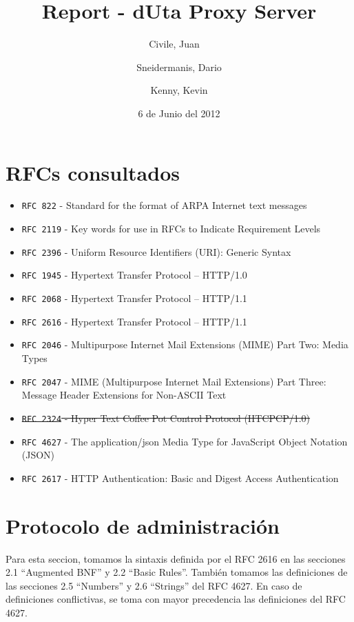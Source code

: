 \documentclass[11pt,a4paper,titlepage]{article}
\title{Report - dUta Proxy Server}
\author{Civile, Juan\ \  \and Sneidermanis, Dario \and Kenny, Kevin}
\date{6 de Junio del 2012}
\begin{document}
\newcommand{\awesome}[1]{\texttt{\large #1}}
\newcommand{\ua}{\textit{User Agent} }
\newcommand{\os}{\textit{Origin Server} }
\newcommand{\duta}{\awesome{dUta} }

\maketitle
\tableofcontents
\clearpage

\section{RFCs consultados}

\begin{itemize}

    \item \awesome{RFC 822}  - Standard for the format of ARPA Internet text messages
    \item \awesome{RFC 2119} - Key words for use in RFCs to Indicate Requirement Levels
    \item \awesome{RFC 2396} - Uniform Resource Identifiers (URI): Generic Syntax
    \item \awesome{RFC 1945} - Hypertext Transfer Protocol -- HTTP/1.0
    \item \awesome{RFC 2068} - Hypertext Transfer Protocol -- HTTP/1.1
    \item \awesome{RFC 2616} - Hypertext Transfer Protocol -- HTTP/1.1
    \item \awesome{RFC 2046} - Multipurpose Internet Mail Extensions (MIME) Part Two: Media Types
    \item \awesome{RFC 2047} - MIME (Multipurpose Internet Mail Extensions) Part Three: Message Header Extensions for Non-ASCII Text
    \item \sout{\awesome{RFC 2324} - Hyper Text Coffee Pot Control Protocol (HTCPCP/1.0)}
    \item \awesome{RFC 4627} - The application/json Media Type for JavaScript Object Notation (JSON)
    \item \awesome{RFC 2617} - HTTP Authentication: Basic and Digest Access Authentication
\end{itemize}


\section{Protocolo de administración}

Para esta seccion, tomamos la sintaxis definida por el RFC 2616 en las secciones 2.1 ``Augmented BNF'' y 2.2 ``Basic Rules''.
También tomamos las definiciones de las secciones 2.5 ``Numbers'' y 2.6 ``Strings'' del RFC 4627.
En caso de definiciones conflictivas, se toma con mayor precedencia las definiciones del RFC 4627.
\end{document}
